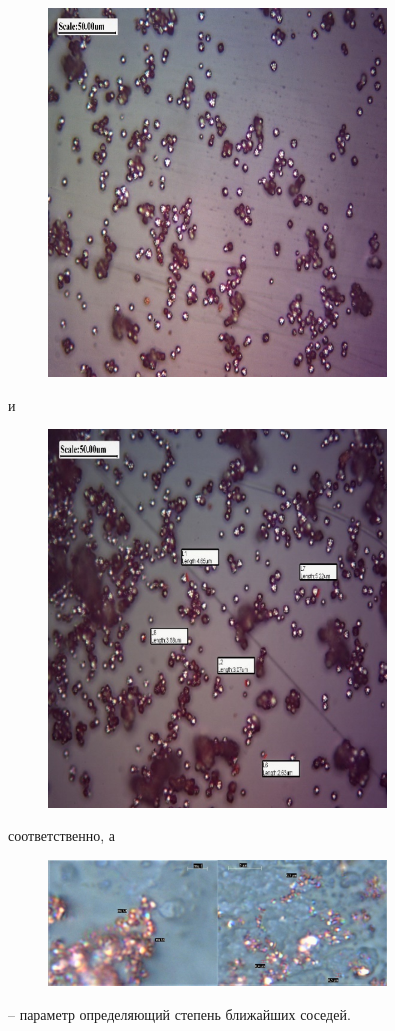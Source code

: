 \begin{figure}[H]
	\centering
	\includegraphics[width=0.8\textwidth]{assets/17}
	\caption*{}
\end{figure} и
\begin{figure}[H]
	\centering
	\includegraphics[width=0.8\textwidth]{assets/18}
	\caption*{}
\end{figure}соответственно, а
\begin{figure}[H]
	\centering
	\includegraphics[width=0.8\textwidth]{assets/22}
	\caption*{}
\end{figure} -- параметр определяющий степень
ближайших соседей.

